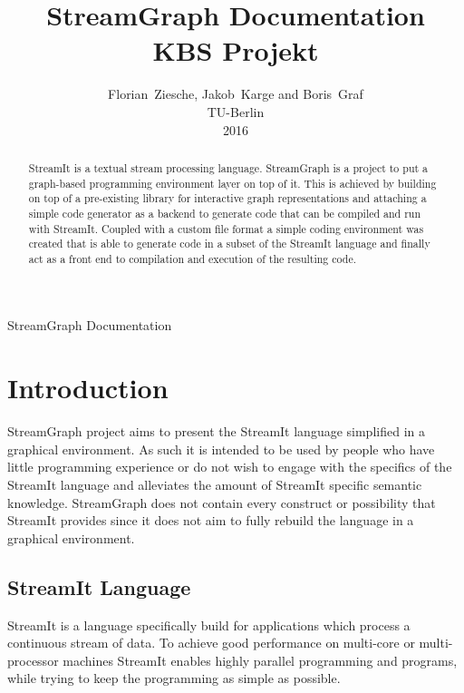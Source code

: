 \documentclass[journal]{IEEEtran}
\begin{document}
\title{StreamGraph Documentation\\KBS Projekt}
\author{Florian~Ziesche, Jakob~Karge and Boris~Graf\\TU-Berlin\\2016}

%
{StreamGraph Documentation}


\maketitle

\begin{abstract}

StreamIt is a textual stream processing language. StreamGraph is a project to
put a graph-based programming environment layer on top of it. This is achieved
by building on top of a pre-existing library for interactive graph
representations and attaching a simple code generator as a backend to generate
code that can be compiled and run with StreamIt. Coupled with a custom file
format a simple coding environment was created that is able to generate code
in a subset of the StreamIt language and finally act as a front end to
compilation and execution of the resulting code.

\end{abstract}


\section{Introduction}
 StreamGraph project aims to present the StreamIt language
simplified in a graphical environment. As such it is intended to be used by
people who have little programming experience or do not wish to engage with the
specifics of the StreamIt language and alleviates the amount of StreamIt
specific semantic knowledge. StreamGraph does not contain every construct
or possibility that StreamIt provides since it does not aim to fully rebuild the
language in a graphical environment.



\subsection{StreamIt Language}
\noindent StreamIt is a language specifically build for applications which
process a continuous stream of data. To achieve good performance on multi-core
or multi-processor machines StreamIt enables highly parallel programming and
programs, while trying to keep the programming as simple as possible.\\
\end{document}
